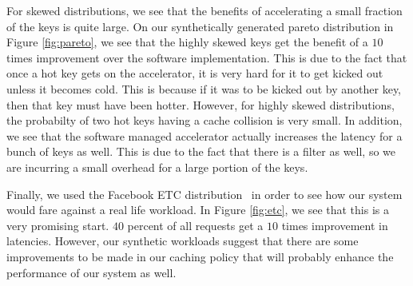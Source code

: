 For skewed distributions, we see that the benefits of accelerating a small
fraction of the keys is quite large. On our synthetically generated pareto
distribution in Figure \ref{fig:pareto}, we see that the highly skewed keys get the
benefit of a $10$ times improvement over the software implementation. This is
due to the fact that once a hot key gets on the accelerator, it is very hard
for it to get kicked out unless it becomes cold. This is because if it was to
be kicked out by another key, then that key must have been hotter. However, for
highly skewed distributions, the probabilty of two hot keys having a cache
collision is very small. In addition, we see that the software managed
accelerator actually increases the latency for a bunch of keys as well. This is
due to the fact that there is a filter as well, so we are incurring a small
overhead for a large portion of the keys.

Finally, we used the Facebook ETC distribution~\cite{AXFJP2012} in order to see
how our system would fare against a real life workload. In Figure
\ref{fig:etc}, we see that this is a very promising start. $40$ percent of all
requests get a $10$ times improvement in latencies. However, our synthetic
workloads suggest that there are some improvements to be made in our caching
policy that will probably enhance the performance of our system as well.
